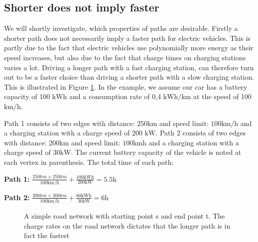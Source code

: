 \subsection{Shorter does not imply faster}
\label{sec:shorternotfaster}
We will shortly investigate, which properties of paths are desirable. Firstly a shorter path does not necessarily imply a faster path for electric vehicles. This is partly due to the fact that electric vehicles use polynomially more energy as their speed increases, but also due to the fact that charge times on charging stations varies a lot. Driving a longer path with a fast charging station, can therefore turn out to be a faster choice than driving a shorter path with a slow charging station. This is illustrated in Figure \ref{fig:simpleroad-network}. In the example, we assume our car has a battery capacity of 100 $\si{\kWh}$ and a consumption rate of 0,4 $\si{\kWh\per\km}$ at the speed of 100 $\si{\km\per\hour}$.

Path 1 consists of two edges with distance: $ 250 \si{\km}$ and speed limit: $100 \si{\km\per\hour}$
and a charging station with a charge speed of 200 $\si{\kW}$. Path 2 consists of two edges with distance: $200 \si{\km}$ and speed limit: $100 \si{\km\hour}$ and a charging station with a charge speed of $30\si{\kW}$. The current battery capacity of the vehicle is noted at each vertex in parenthesis. The total time of each path:
				
\textbf{Path 1:} $\frac{250\si{km} + 250\si{km}}{100\si{\km\per\hour}} + \frac{100\si{\kWh}}{200\si{\kW}} = 5.5\si{\hour}$

\textbf{Path 2:} $\frac{200\si{km} + 200\si{km}}{100 \si{\km\per\hour}} + \frac{60\si{\kWh}}{30\si{\kW}} = 6\si{\hour}$

\begin{figure}
\label{fig:simpleroad-network}
\caption{A simple road network with starting point s and end point t. The charge rates on the road network dictates that the longer path is in fact the fastest}
\end{figure}